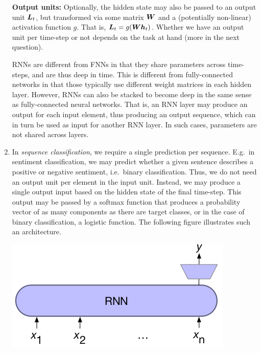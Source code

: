\documentclass[11pt,a4paper]{article}
\begin{document}
\begin{enumerate}[label=(\alph*)]
          \textbf{Output units:} Optionally, the hidden state may also be passed
          to an output unit ${\boldsymbol{L}}_t$, but transformed via some matrix ${\boldsymbol{W}}$ and
          a (potentially non-linear) activation function $g$.
          That is, ${\boldsymbol{L}}_t = g({\boldsymbol{W}}{\boldsymbol{h}}_t)$.
          Whether we have an output unit per time-step or not depends on the
          task at hand (more in the next question).

          RNNs are different from FNNs in that they share parameters across
          time-steps, and are thus deep in time.
          This is different from fully-connected networks in that those
          typically use different weight matrices in each hidden layer.
          However, RNNs can also be stacked to become deep in the same sense as
          fully-connected neural networks.
          That is, an RNN layer may produce an output for each input element,
          thus producing an output sequence, which can in turn be used as input
          for another RNN layer.
          In such cases, parameters are not shared across layers.
    \item In \emph{sequence classification}, we require a single prediction per
          sequence. E.g.\ in sentiment classification, we may predict whether a
          given sentence describes a positive or negative sentiment, i.e.\
          binary classification.
          Thus, we do not need an output unit per element in the input unit.
          Instead, we may produce a single output input based on the hidden
          state of the final time-step.
          This output may be passed by a softmax function that produces a
          probability vector of as many components as there are target classes,
          or in the case of binary classification, a logistic function.
          The following figure illustrates such an architecture.
          \begin{center}
              \includegraphics[scale=0.5]{img/sequence_classification_1.png}
          \end{center}


\end{enumerate}
\end{document}
